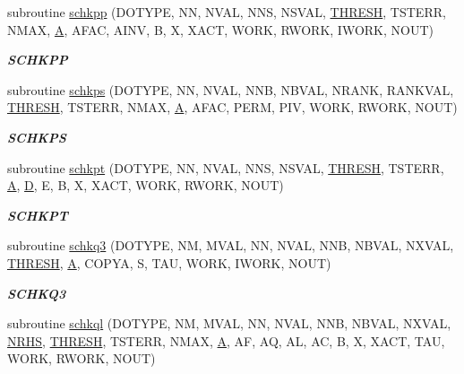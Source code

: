 \begin{DoxyCompactItemize}
subroutine \hyperlink{group__single__lin_gac4fc942f831d5b0fc5620ee6602fee61}{schkpp} (D\+O\+T\+Y\+P\+E, N\+N, N\+V\+A\+L, N\+N\+S, N\+S\+V\+A\+L, \hyperlink{zlaqgs_8c_a0656018abfc9fa2821827415f5d5ea57}{T\+H\+R\+E\+S\+H}, T\+S\+T\+E\+R\+R, N\+M\+A\+X, \hyperlink{classA}{A}, A\+F\+A\+C, A\+I\+N\+V, B, X, X\+A\+C\+T, W\+O\+R\+K, R\+W\+O\+R\+K, I\+W\+O\+R\+K, N\+O\+U\+T)
\begin{DoxyCompactList}\small\item\em {\bfseries S\+C\+H\+K\+P\+P} \end{DoxyCompactList}\item 
subroutine \hyperlink{group__single__lin_ga74880f8fbd9279596ab526f5380e3e09}{schkps} (D\+O\+T\+Y\+P\+E, N\+N, N\+V\+A\+L, N\+N\+B, N\+B\+V\+A\+L, N\+R\+A\+N\+K, R\+A\+N\+K\+V\+A\+L, \hyperlink{zlaqgs_8c_a0656018abfc9fa2821827415f5d5ea57}{T\+H\+R\+E\+S\+H}, T\+S\+T\+E\+R\+R, N\+M\+A\+X, \hyperlink{classA}{A}, A\+F\+A\+C, P\+E\+R\+M, P\+I\+V, W\+O\+R\+K, R\+W\+O\+R\+K, N\+O\+U\+T)
\begin{DoxyCompactList}\small\item\em {\bfseries S\+C\+H\+K\+P\+S} \end{DoxyCompactList}\item 
subroutine \hyperlink{group__single__lin_gad0a585f3a67ddc9aa80c0b268ffff29e}{schkpt} (D\+O\+T\+Y\+P\+E, N\+N, N\+V\+A\+L, N\+N\+S, N\+S\+V\+A\+L, \hyperlink{zlaqgs_8c_a0656018abfc9fa2821827415f5d5ea57}{T\+H\+R\+E\+S\+H}, T\+S\+T\+E\+R\+R, \hyperlink{classA}{A}, \hyperlink{odrpack_8h_a7dae6ea403d00f3687f24a874e67d139}{D}, E, B, X, X\+A\+C\+T, W\+O\+R\+K, R\+W\+O\+R\+K, N\+O\+U\+T)
\begin{DoxyCompactList}\small\item\em {\bfseries S\+C\+H\+K\+P\+T} \end{DoxyCompactList}\item 
subroutine \hyperlink{group__single__lin_ga48d745bd6eb09e070eb866719804a48b}{schkq3} (D\+O\+T\+Y\+P\+E, N\+M, M\+V\+A\+L, N\+N, N\+V\+A\+L, N\+N\+B, N\+B\+V\+A\+L, N\+X\+V\+A\+L, \hyperlink{zlaqgs_8c_a0656018abfc9fa2821827415f5d5ea57}{T\+H\+R\+E\+S\+H}, \hyperlink{classA}{A}, C\+O\+P\+Y\+A, S, T\+A\+U, W\+O\+R\+K, I\+W\+O\+R\+K, N\+O\+U\+T)
\begin{DoxyCompactList}\small\item\em {\bfseries S\+C\+H\+K\+Q3} \end{DoxyCompactList}\item 
subroutine \hyperlink{group__single__lin_gaf956e20b51ae4c40c70f63716599dc3b}{schkql} (D\+O\+T\+Y\+P\+E, N\+M, M\+V\+A\+L, N\+N, N\+V\+A\+L, N\+N\+B, N\+B\+V\+A\+L, N\+X\+V\+A\+L, \hyperlink{example__user_8c_aa0138da002ce2a90360df2f521eb3198}{N\+R\+H\+S}, \hyperlink{zlaqgs_8c_a0656018abfc9fa2821827415f5d5ea57}{T\+H\+R\+E\+S\+H}, T\+S\+T\+E\+R\+R, N\+M\+A\+X, \hyperlink{classA}{A}, A\+F, A\+Q, A\+L, A\+C, B, X, X\+A\+C\+T, T\+A\+U, W\+O\+R\+K, R\+W\+O\+R\+K, N\+O\+U\+T)

\end{DoxyCompactItemize}
